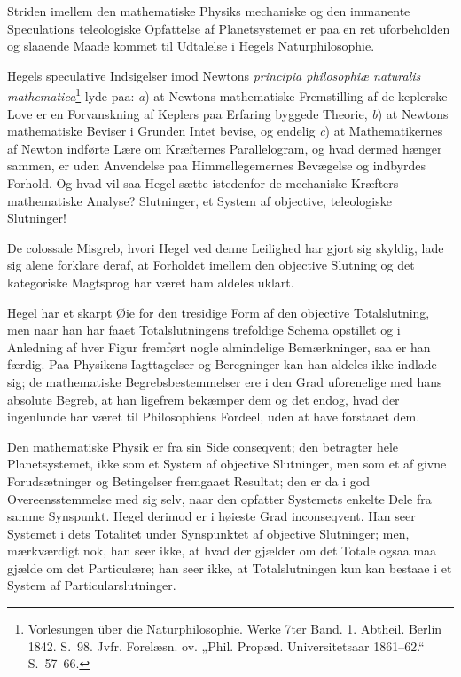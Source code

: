 \documentclass[12pt]{book}
\newcommand{\opage}[1]{\marginnote{\footnotesize\textit{[#1]}}}
\begin{document}
Striden imellem den mathematiske Physiks mechaniske og den immanente Speculations teleologiske Opfattelse af Planetsystemet er paa en ret uforbeholden og slaaende Maade kommet til Udtalelse i Hegels Naturphilosophie.

Hegels speculative Indsigelser imod Newtons \textit{principia
\opage{427}philosophiæ naturalis mathematica}\footnote{Vorlesungen über die Naturphilosophie. Werke 7ter Band. 1. Abtheil. Berlin 1842. S.~98. Jvfr. Forelæsn. ov. „Phil. Propæd. Universitetsaar 1861--62.“ S.~57--66.}%
{} lyde paa: \textit{a}) at Newtons mathematiske Fremstilling af de keplerske Love er en Forvanskning af Keplers paa Erfaring byggede Theorie, \textit{b}) at Newtons mathematiske Beviser i Grunden Intet bevise, og endelig \textit{c}) at Mathematikernes af Newton indførte Lære om Kræfternes Parallelogram, og hvad dermed hænger sammen, er uden Anvendelse paa Himmellegemernes Bevægelse og indbyrdes Forhold. Og hvad vil saa Hegel sætte istedenfor de mechaniske Kræfters mathematiske Analyse? Slutninger, et System af objective, teleologiske Slutninger!

De colossale Misgreb, hvori Hegel ved denne Leilighed har gjort sig skyldig, lade sig alene forklare deraf, at Forholdet imellem den objective Slutning og det kategoriske Magtsprog har været ham aldeles uklart.

Hegel har et skarpt Øie for den tresidige Form af den objective Totalslutning, men naar han har faaet Totalslutningens trefoldige Schema opstillet og i Anledning af hver Figur fremført nogle almindelige Bemærkninger, saa er han færdig. Paa Physikens Iagttagelser og Beregninger kan han aldeles ikke indlade sig; de mathematiske Begrebsbestemmelser ere i den Grad uforenelige med hans absolute Begreb, at han ligefrem bekæmper dem og det endog, hvad der ingenlunde har været til Philosophiens Fordeel, uden at have forstaaet dem.

Den mathematiske Physik er fra sin Side conseqvent; den betragter hele Planetsystemet, ikke som et System af objective Slutninger, men som et af givne Forudsætninger og Betingelser fremgaaet Resultat; den er da i god Overeensstemmelse med sig selv, naar den opfatter Systemets enkelte
\opage{428}Dele fra samme Synspunkt. Hegel derimod er i høieste Grad inconseqvent. Han seer Systemet i dets Totalitet under Synspunktet af objective Slutninger; men, mærkværdigt nok, han seer ikke, at hvad der gjælder om det Totale ogsaa maa gjælde om det Particulære; han seer ikke, at Totalslutningen kun kan bestaae i et System af Particularslutninger.
\end{document}
